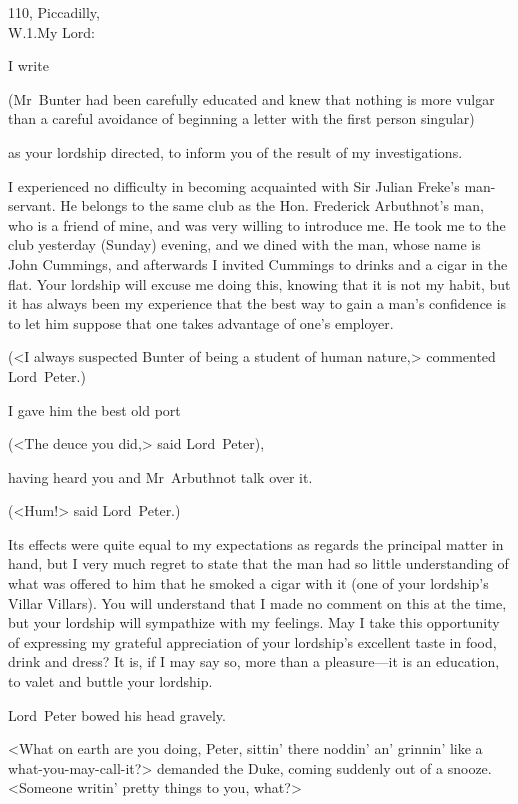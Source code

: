 \begin{mail}{110, Piccadilly,\\W\@.1.}{My Lord:}

I write 

\pausemail
(Mr~Bunter had been carefully educated and knew that nothing is more vulgar than a careful avoidance of beginning a letter with the first person singular) 
\resumemail

as your lordship directed, to inform you of the result of my investigations.

I experienced no difficulty in becoming acquainted with Sir Julian Freke's man-servant. He belongs to the same club as the Hon. Frederick Arbuthnot's man, who is a friend of mine, and was very willing to introduce me. He took me to the club yesterday (Sunday) evening, and we dined with the man, whose name is John Cummings, and afterwards I invited Cummings to drinks and a cigar in the flat. Your lordship will excuse me doing this, knowing that it is not my habit, but it has always been my experience that the best way to gain a man's confidence is to let him suppose that one takes advantage of one's employer.

\pausemail
(<I always suspected Bunter of being a student of human nature,> commented Lord~Peter.)
\resumemail

I gave him the best old port 

\pausemail
(<The deuce you did,> said Lord~Peter), 
\resumemail

having heard you and Mr~Arbuthnot talk over it.

\pausemail
 (<Hum!> said Lord~Peter.)
\resumemail

Its effects were quite equal to my expectations as regards the principal matter in hand, but I very much regret to state that the man had so little understanding of what was offered to him that he smoked a cigar with it (one of your lordship's Villar Villars). You will understand that I made no comment on this at the time, but your lordship will sympathize with my feelings. May I take this opportunity of expressing my grateful appreciation of your lordship's excellent taste in food, drink and dress? It is, if I may say so, more than a pleasure—it is an education, to valet and buttle your lordship.

\pausemail
Lord~Peter bowed his head gravely.

<What on earth are you doing, Peter, sittin' there noddin' an' grinnin' like a what-you-may-call-it?> demanded the Duke, coming suddenly out of a snooze. <Someone writin' pretty things to you, what?>


\end{mail}
